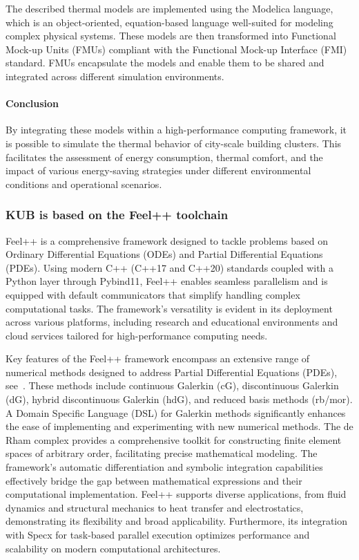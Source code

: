 \documentclass[runningheads]{llncs}
\begin{document}
The described thermal models are implemented using the Modelica language, which is an object-oriented, equation-based language well-suited for modeling complex physical systems. 
These models are then transformed into Functional Mock-up Units (FMUs) compliant with the Functional Mock-up Interface (FMI) standard. 
FMUs encapsulate the models and enable them to be shared and integrated across different simulation environments.


\paragraph{Conclusion} By integrating these models within a high-performance computing framework, it is possible to simulate the thermal behavior of city-scale building clusters.
This facilitates the assessment of energy consumption, thermal comfort, and the impact of various energy-saving strategies under different environmental conditions and operational scenarios.

\subsubsection{KUB is based on the Feel++ toolchain}

Feel++ is a comprehensive framework designed to tackle problems based on Ordinary Differential Equations (ODEs) and Partial Differential Equations (PDEs). 
Using modern C++ (C++17 and C++20) standards coupled with a Python layer through Pybind11, Feel++ enables seamless parallelism and is equipped with default communicators that simplify handling complex computational tasks.
The framework's versatility is evident in its deployment across various platforms, including research and educational environments and cloud services tailored for high-performance computing needs.

Key features of the Feel++ framework encompass an extensive range of numerical methods designed to address Partial Differential Equations (PDEs), see~\cite{christophe_prudhomme_feelppfeelpp_2024}. 
These methods include continuous Galerkin (cG), discontinuous Galerkin (dG), hybrid discontinuous Galerkin (hdG), and reduced basis methods (rb/mor). 
A Domain Specific Language (DSL) for Galerkin methods significantly enhances the ease of implementing and experimenting with new numerical methods. 
The de Rham complex provides a comprehensive toolkit for constructing finite element spaces of arbitrary order, facilitating precise mathematical modeling. 
The framework's automatic differentiation and symbolic integration capabilities effectively bridge the gap between mathematical expressions and their computational implementation.
Feel++ supports diverse applications, from fluid dynamics and structural mechanics to heat transfer and electrostatics, demonstrating its flexibility and broad applicability.
Furthermore, its integration with Specx for task-based parallel execution optimizes performance and scalability on modern computational architectures.
\end{document}
